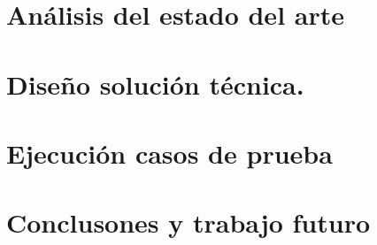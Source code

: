\documentclass[12pt, a4paper]{book}
\begin{document}

\setmainfont{Carlito}
\frontmatter 


\tableofcontents	%
\listoffigures		%
\listoftables		%
\listofcodes	    %
\cleardoublepage

\mainmatter
\pagestyle{fancy}



\chapter{Análisis del estado del arte}
 
 
\chapter{Diseño solución técnica.}


\chapter{Ejecución casos de prueba}


\chapter{Conclusones y trabajo futuro}

\newpage

\appendix


\cleardoublepage
\thispagestyle{empty}

% 

 

\glsaddall
\printglossary[title=Glosario,toctitle=Glosario]
\end{document}
